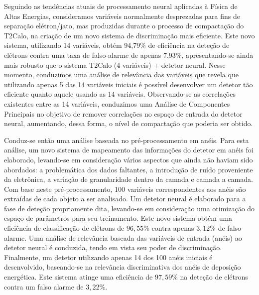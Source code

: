 Seguindo as tendências atuais de processamento neural aplicadas à Física de
Altas Energias, consideramos variáveis normalmente desprezadas para fins de
separação elétron/jato, mas produzidas durante o processo de compactação do
T2Calo, na criação de um novo sistema de discriminação mais eficiente. Este
novo sistema, utilizando 14 variáveis, obtém 94,79\% de eficiência na deteção
de elétrons contra uma taxa de falso-alarme de apenas 7,93\%, apresentando-se
ainda mais robusto que o sistema T2Calo (4 variáveis) $+$ detetor
neural. Nesse momento, conduzimos uma análise de relevância das variáveis que
revela que utilizando apenas 5 das 14 variáveis iniciais é possível
desenvolver um detetor tão eficiente quanto aquele usando as 14 variáveis.
Observando-se as correlações existentes entre as 14 variáveis, conduzimos uma
Análise de Componentes Principais no objetivo de remover correlações no espaço
de entrada do detetor neural, aumentando, dessa forma, o nível de compactação
que poderia ser obtido.

Conduz-se então uma análise baseada no pré-processamento em anéis. Para esta
análise, um novo sistema de mapeamento das informações do detetor em anéis foi
elaborado, levando-se em consideração vários aspectos que ainda não haviam
sido abordados: a problemática dos dados faltantes, a introdução de ruído
proveniente da eletrônica, a variação de granularidade dentro da camada e
camada a camada. Com base neste pré-processamento, 100 variáveis
correspondentes aos anéis são extraídas de cada objeto a ser analisado. Um
detetor neural é elaborado para a fase de deteção propriamente dita,
levando-se em consideração uma otimização do espaço de parâmetros para seu
treinamento. Este novo sistema obtém uma eficiência de classificação de
elétrons de $96,55$\% contra apenas $3,12$\% de falso-alarme. Uma análise de
relevância baseada das variáveis de entrada (anéis) ao detetor neural é
conduzida, tendo em vista seu poder de discriminação. Finalmente, um detetor
utilizando apenas 14 dos 100 anéis iniciais é desenvolvido, baseando-se na
relevância discriminativa dos anéis de deposição energética. Este sistema
atinge uma eficiência de $97,59$\% na deteção de elétrons contra um falso
alarme de $3,22$\%.

